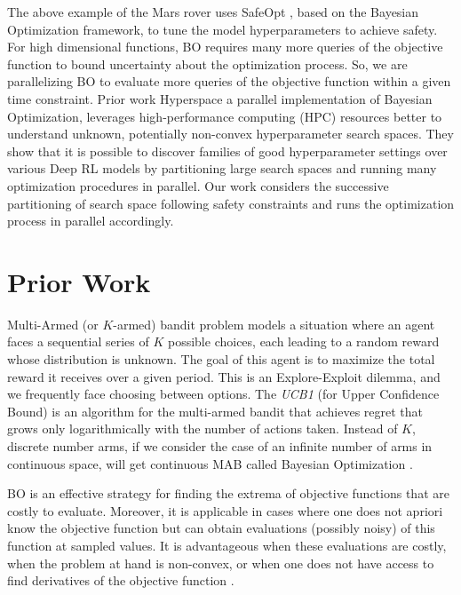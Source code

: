 The above example of the Mars rover uses SafeOpt \cite{SuiGBK15}, based on the Bayesian Optimization framework, to tune the model hyperparameters to achieve safety. 
For high dimensional functions, BO requires many more queries of the objective function to bound uncertainty about the optimization process.
So, we are parallelizing BO to evaluate more queries of the objective function within a given time constraint.
Prior work Hyperspace \cite{YoungHRK18} a parallel implementation of Bayesian Optimization, leverages high-performance computing (HPC) resources better to understand unknown, potentially non-convex hyperparameter search spaces. 
They show that it is possible to discover families of good hyperparameter settings over various Deep RL models by partitioning large search spaces and running many optimization procedures in parallel. 
Our work considers the successive partitioning of search space following safety constraints and runs the optimization process in parallel accordingly.

\section{Prior Work}
\label{sec:prior-work}
Multi-Armed (or $K$-armed) bandit problem models a situation where an agent faces a sequential series of $K$ possible choices, each leading to a random reward whose distribution is unknown. 
The goal of this agent is to maximize the total reward it receives over a given period. 
This is an Explore-Exploit dilemma, and we frequently face choosing between options. The \textit{UCB1} \cite{ucb1} (for Upper Confidence Bound) is an algorithm for the multi-armed bandit that achieves regret that grows only logarithmically with the number of actions taken.
Instead of $K$, discrete number arms, if we consider the case of an infinite number of arms in continuous space, will get continuous MAB called Bayesian Optimization \cite{Srinivas-Bandits}.

BO is an effective strategy for finding the extrema of objective functions that are costly to evaluate. 
Moreover, it is applicable in cases where one does not apriori know the objective function but can obtain evaluations (possibly noisy) of this function at sampled values. 
It is advantageous when these evaluations are costly, when the problem at hand is non-convex, or when one does not have access to find derivatives of the objective function \cite{Freitas-BO}.

